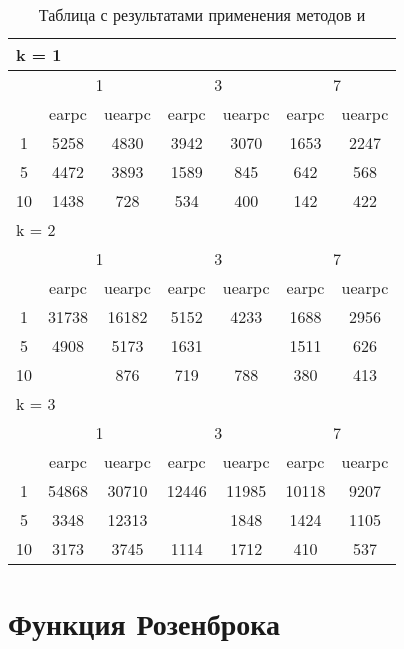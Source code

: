 \begin{table}
  \centering
  \begin{tabular}{|*7{c|}}
    \hline
    \multicolumn{7}{|l|}{k = 1} \\
    \hline
    \multirow{2}{*}{\diagbox{$\mu$}{$\lambda$}} & \multicolumn{2}{c|}{1} & \multicolumn{2}{c|}{3} & \multicolumn{2}{c|}{7} \\
    \cline{2-7}
    & earpc & uearpc & earpc & uearpc & earpc & uearpc \\
    \hline
    1 & 5258 & 4830 & 3942 & 3070 & 1653 & 2247 \\
    \hline
    5 & 4472 & 3893 & 1589 & 845 & 642& 568 \\
    \hline
    10 & 1438 & 728 & 534 & 400& 142 & 422 \\
    \hline
    \multicolumn{7}{|l|}{k = 2} \\
    \hline
    \multirow{2}{*}{\diagbox{$\mu$}{$\lambda$}} & \multicolumn{2}{c|}{1} & \multicolumn{2}{c|}{3} & \multicolumn{2}{c|}{7} \\
    \cline{2-7}
    & earpc & uearpc & earpc & uearpc & earpc & uearpc \\
    \hline
    1 & 31738 & 16182 & 5152 & 4233 & 1688 & 2956 \\
    \hline
    5 & 4908 & 5173 & 1631& \cellcolor{olive}{946} & 1511 & 626 \\
    \hline
    10& \cellcolor{olive}{778} & 876 & 719 & 788 & 380 & 413 \\
    \hline
    \multicolumn{7}{|l|}{k = 3} \\
    \hline
    \multirow{2}{*}{\diagbox{$\mu$}{$\lambda$}} & \multicolumn{2}{c|}{1} & \multicolumn{2}{c|}{3} & \multicolumn{2}{c|}{7} \\
    \cline{2-7}
    & earpc & uearpc & earpc & uearpc & earpc & uearpc \\
    \hline
    1 & 54868 & 30710 & 12446 & 11985 & 10118 & 9207 \\
    \hline
    5 & 3348 & 12313& \cellcolor{olive}{1379} & 1848 & 1424 & 1105 \\
    \hline
    10 & 3173 & 3745 & 1114 & 1712 & 410 & 537 \\
    \hline
  \end{tabular}
  \captionsetup{justification=centering}
  \caption{Таблица с результатами применения методов  и }
\end{table}


\section{Функция Розенброка}

